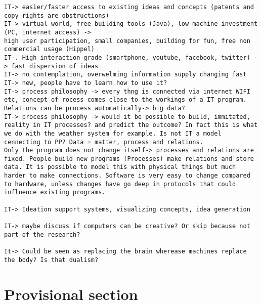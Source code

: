 \documentclass[a4paper]{Thesis}
\begin{document}
\begin{verbatim}
IT-> easier/faster access to existing ideas and concepts (patents and copy rights are obstructions)
IT-> virtual world, free building tools (Java), low machine investment (PC, internet access) -> 
high user participation, small companies, building for fun, free non commercial usage (Hippel)
IT-. High interaction grade (smartphone, youtube, facebook, twitter) -> fast dispersion of ideas
IT-> no contemplation, overwelming information supply changing fast
IT-> new, people have to learn how to use it?
IT-> process philosophy -> every thng is connected via internet WIFI etc, concept of rocess comes close to the workings of a IT program. Relations can be process automatically-> big data?
IT-> process philosophy -> would it be possible to build, immitated, reality in IT processes? and predict the outcome? In fact this is what we do with the weather system for example. Is not IT a model cennecting to PP? Data = matter, process and relations.
Only the program does not change itself-> processes and relations are fixed. People build new programs (Processes) make relations and store data. It is possible to model this with physical things but much harder to make connections. Software is very easy to change compared to hardware, unless changes have go deep in protocols that could influence existing programs.

IT-> Ideation support systems, visualizing concepts, idea generation

IT-> maybe discuss if computers can be creative? Or skip because not part of the research?

It-> Could be seen as replacing the brain wherease machines replace the body? Is that dualism?
\end{verbatim}

\section{Provisional section}

\bigskip


\end{document}
